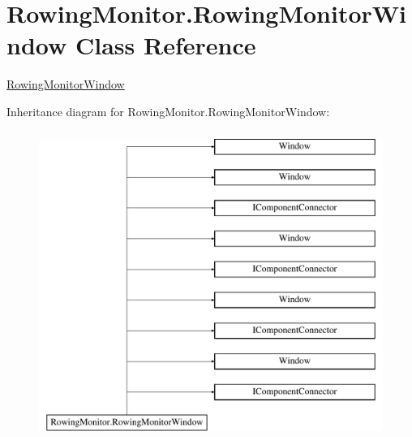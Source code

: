 \hypertarget{class_rowing_monitor_1_1_rowing_monitor_window}{}\section{Rowing\+Monitor.\+Rowing\+Monitor\+Window Class Reference}
\label{class_rowing_monitor_1_1_rowing_monitor_window}


\hyperlink{class_rowing_monitor_1_1_rowing_monitor_window}{Rowing\+Monitor\+Window}  


Inheritance diagram for Rowing\+Monitor.\+Rowing\+Monitor\+Window\+:\begin{figure}[H]
\begin{center}
\leavevmode
\includegraphics[height=10.000000cm]{class_rowing_monitor_1_1_rowing_monitor_window}
\end{center}
\end{figure}
